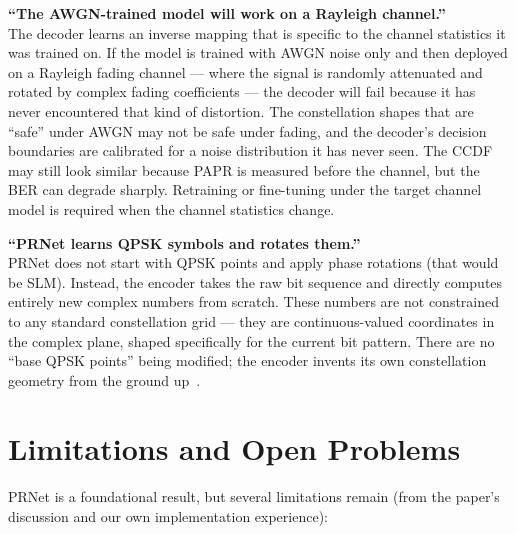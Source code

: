 \begin{misconception}
    \textbf{``The AWGN-trained model will work on a Rayleigh channel.''} \\
    The decoder learns an inverse mapping that is specific to the channel statistics it was trained on.  If the model is trained with AWGN noise only and then deployed on a Rayleigh fading channel --- where the signal is randomly attenuated and rotated by complex fading coefficients --- the decoder will fail because it has never encountered that kind of distortion.  The constellation shapes that are ``safe'' under AWGN may not be safe under fading, and the decoder's decision boundaries are calibrated for a noise distribution it has never seen.  The CCDF may still look similar because PAPR is measured before the channel, but the BER can degrade sharply.  Retraining or fine-tuning under the target channel model is required when the channel statistics change.
\end{misconception}

\begin{misconception}
    \textbf{``PRNet learns QPSK symbols and rotates them.''} \\
    PRNet does not start with QPSK points and apply phase rotations (that would be SLM).  Instead, the encoder takes the raw bit sequence and directly computes entirely new complex numbers from scratch.  These numbers are not constrained to any standard constellation grid --- they are continuous-valued coordinates in the complex plane, shaped specifically for the current bit pattern.  There are no ``base QPSK points'' being modified; the encoder invents its own constellation geometry from the ground up~\cite{kim2017novel}.
\end{misconception}


\section{Limitations and Open Problems}

PRNet is a foundational result, but several limitations remain (from the paper's discussion and our own implementation experience):

